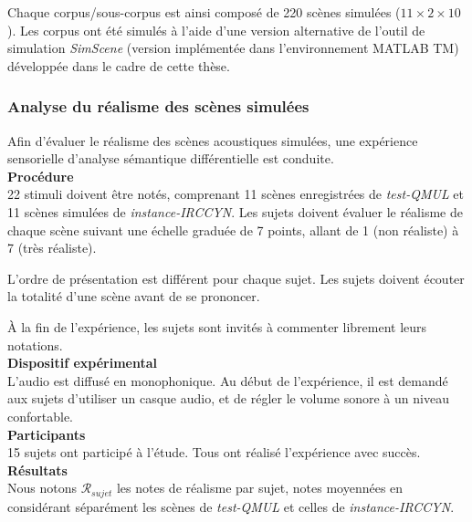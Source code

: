 Chaque corpus/sous-corpus est ainsi composé de 220 scènes simulées ($11\times2\times10$). Les corpus ont été simulés à l'aide d'une version alternative de l'outil de simulation \emph{SimScene} (version implémentée dans l'environnement MATLAB TM) développée dans le cadre de cette thèse.

\subsubsection{Analyse du réalisme des scènes simulées}

Afin d'évaluer le réalisme des scènes acoustiques simulées, une expérience sensorielle d'analyse sémantique différentielle est conduite. \\

{\setlength{\parindent}{0cm}\textbf{Procédure}} \\

22 stimuli doivent être notés, comprenant 11 scènes enregistrées de \emph{test-QMUL} et 11 scènes simulées de \emph{instance-IRCCYN}. Les sujets doivent évaluer le réalisme de chaque scène suivant une échelle graduée de 7 points, allant de 1 (non réaliste) à 7 (très réaliste). 

L'ordre de présentation est différent pour chaque sujet. Les sujets doivent écouter la totalité d'une scène avant de se prononcer.

À la fin de l'expérience, les sujets sont invités à commenter librement leurs notations. \\

{\setlength{\parindent}{0cm}\textbf{Dispositif expérimental}} \\

L'audio est diffusé en monophonique. Au début de l'expérience, il est demandé aux sujets d'utiliser un casque audio, et de régler le volume sonore à un niveau confortable.  \\

{\setlength{\parindent}{0cm}\textbf{Participants}} \\

15 sujets ont participé à l'étude. Tous ont réalisé l'expérience avec succès. \\

{\setlength{\parindent}{0cm}\textbf{Résultats}} \\

Nous notons $\mathcal{R}_{sujet}$ les notes de réalisme par sujet, notes moyennées en considérant séparément les scènes de \emph{test-QMUL} et celles de \emph{instance-IRCCYN}.

